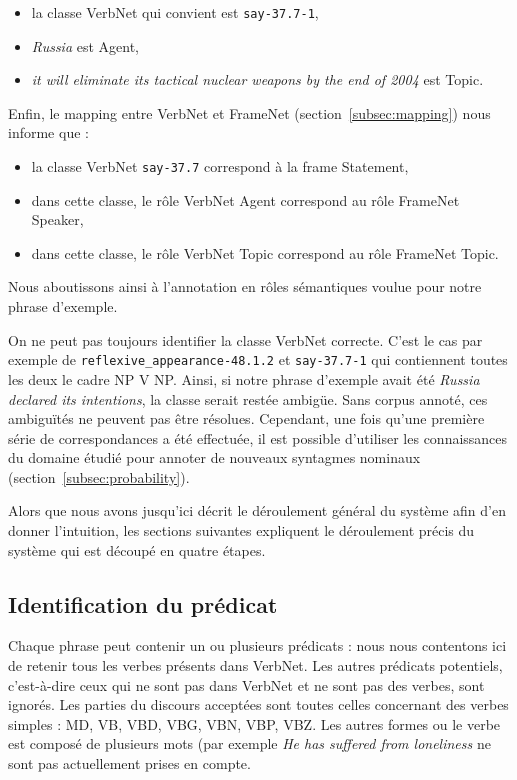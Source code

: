 \begin{itemize}
    \item la classe VerbNet qui convient est \texttt{say-37.7-1},
    \item \textit{Russia} est Agent,
    \item \textit{it will eliminate its tactical nuclear weapons by the end of 2004} est Topic.
\end{itemize}

Enfin, le mapping entre VerbNet et FrameNet (section~\ref{subsec:mapping}) nous
informe que :

\begin{itemize}
    \item la classe VerbNet \texttt{say-37.7} correspond à la frame Statement,
    \item dans cette classe, le rôle VerbNet Agent correspond au rôle FrameNet Speaker,
    \item dans cette classe, le rôle VerbNet Topic correspond au rôle FrameNet Topic.
\end{itemize}

Nous aboutissons ainsi à l'annotation en rôles sémantiques voulue pour notre
phrase d'exemple.

On ne peut pas toujours identifier la classe VerbNet correcte. C'est le cas par
exemple de \texttt{reflexive\_appearance-48.1.2} et \texttt{say-37.7-1} qui
contiennent toutes les deux le cadre NP V NP. Ainsi, si notre phrase d'exemple
avait été \textit{Russia declared its intentions}, la classe serait restée
ambigüe. Sans corpus annoté, ces ambiguïtés ne peuvent pas être résolues.
Cependant, une fois qu'une première série de correspondances a été effectuée,
il est possible d'utiliser les connaissances du domaine étudié pour annoter de
nouveaux syntagmes nominaux (section~\ref{subsec:probability}).

Alors que nous avons jusqu'ici décrit le déroulement général du système afin
d'en donner l'intuition, les sections suivantes expliquent le déroulement
précis du système qui est découpé en quatre étapes.

\subsection{Identification du prédicat}

Chaque phrase peut contenir un ou plusieurs prédicats : nous nous contentons
ici de retenir tous les verbes présents dans VerbNet. Les autres prédicats
potentiels, c'est-à-dire ceux qui ne sont pas dans VerbNet et ne sont pas des
verbes, sont ignorés. Les parties du discours acceptées sont toutes celles
concernant des verbes simples : MD, VB, VBD, VBG, VBN, VBP, VBZ. Les autres
formes ou le verbe est composé de plusieurs mots (par exemple \textit{He has
suffered from loneliness} ne sont pas actuellement prises en compte.

